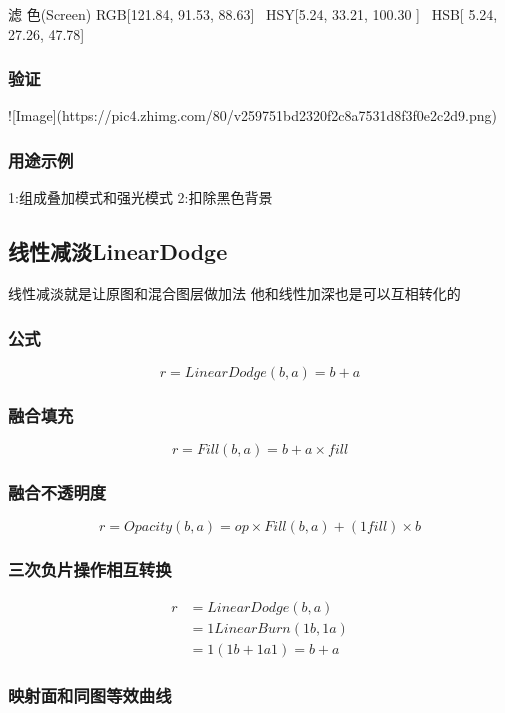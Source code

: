 滤    色(Screen)        RGB[121.84,  91.53,  88.63]~ HSY[5.24,  33.21, 100.30  ]~ HSB[  5.24,  27.26,  47.78]


\subsubsection{ 验证}

![Image](https://pic4.zhimg.com/80/v259751bd2320f2c8a7531d8f3f0e2c2d9.png)

\subsubsection{ 用途示例}

1:组成叠加模式和强光模式
2:扣除黑色背景

\subsection{ 线性减淡LinearDodge}

线性减淡就是让原图和混合图层做加法
他和线性加深也是可以互相转化的

\subsubsection{ 公式}

$$r=LinearDodge(b,a)=b+a$$

\subsubsection{ 融合填充}

$$r= Fill(b,a) =b+a\times fill $$

\subsubsection{ 融合不透明度}

$$r=Opacity(b,a)=op\times Fill(b,a)+(1fill)\times b$$

\subsubsection{ 三次负片操作相互转换}
$$\begin{aligned}
	r&=LinearDodge(b,a)\\&= 1LinearBurn(1b,1a)\\& = 1(1b+1a1)=b+a
\end{aligned}$$

\subsubsection{ 映射面和同图等效曲线}

